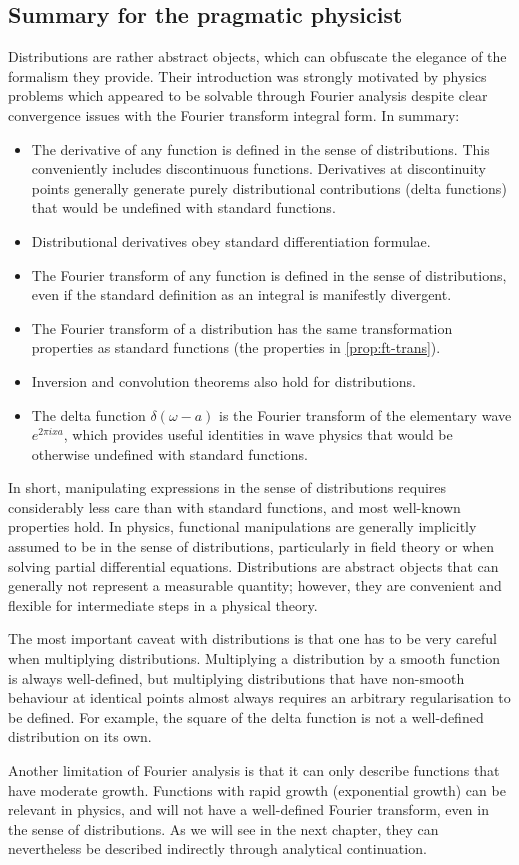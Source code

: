 \subsection{Summary for the pragmatic physicist}
Distributions are rather abstract objects, which can obfuscate the elegance of the
formalism they provide. Their introduction was strongly motivated by physics problems
which appeared to be solvable through Fourier analysis despite clear convergence issues
with the Fourier transform integral form. In summary:
\begin{itemize}
  \item The derivative of any function is defined in the sense of distributions. This
    conveniently includes discontinuous functions. Derivatives at discontinuity points
    generally generate purely distributional contributions (\eg delta functions) that
    would be undefined with standard functions.
  \item Distributional derivatives obey standard differentiation formulae.
  \item The Fourier transform of any function is defined in the sense of distributions,
    even if the standard definition as an integral is manifestly divergent.
  \item The Fourier transform of a distribution has the same transformation properties as
    standard functions (\ie the properties in \cref{prop:ft-trans}).
  \item Inversion and convolution theorems also hold for distributions.
  \item The delta function $\delta(\omega-a)$ is the Fourier transform of the elementary
    wave $e^{2\pi i xa}$, which provides useful identities in wave physics that would be
    otherwise undefined with standard functions.
\end{itemize}
In short, manipulating expressions in the sense of distributions requires considerably
less care than with standard functions, and most well-known properties hold. In physics,
functional manipulations are generally implicitly assumed to be in the sense of
distributions, particularly in field theory or when solving partial differential
equations. Distributions are abstract objects that can generally not represent a measurable
quantity; however, they are convenient and flexible for intermediate steps in a physical
theory.

The most important caveat with distributions is that one has to be very careful when
multiplying distributions. Multiplying a distribution by a smooth function is always
well-defined, but multiplying distributions that have non-smooth behaviour at identical
points almost always requires an arbitrary regularisation to be defined. For example, the
square of the delta function is not a well-defined distribution on its own.

Another limitation of Fourier analysis is that it can only describe functions that have
moderate growth. Functions with rapid growth (\eg exponential growth) can be relevant in
physics, and will not have a well-defined Fourier transform, even in the sense of
distributions. As we will see in the next chapter, they can nevertheless be described
indirectly through analytical continuation.
